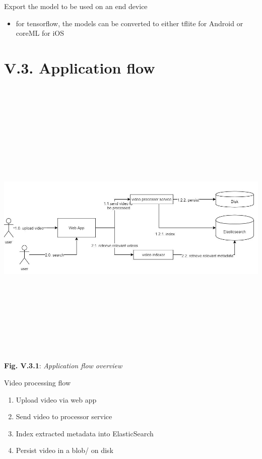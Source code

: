 \documentclass[11pt, a4papper]{report}
\theoremstyle{plain}
\theoremstyle{definition}
\theoremstyle{definition}
\theoremstyle{proposition}
\begin{document}
Export the model to be used on an end device
\begin{itemize}
	\item for tensorflow, the models can be converted to either tflite for Android or coreML for iOS
\end{itemize}

\section*{V.3. Application flow}
\
\\
\begin{center}
	\includegraphics[width=16cm,height=13cm,keepaspectratio]{application-flow}
\end{center}
\begin{center}
	\textbf{Fig. V.3.1}: \textit{Application flow overview}
\end{center}

Video processing flow

\begin{enumerate}
	\item Upload video via web app
	\item Send video to processor service
	\item Index extracted metadata into ElasticSearch
	\item Persist video in a blob/ on disk
\end{enumerate}
\end{document}
